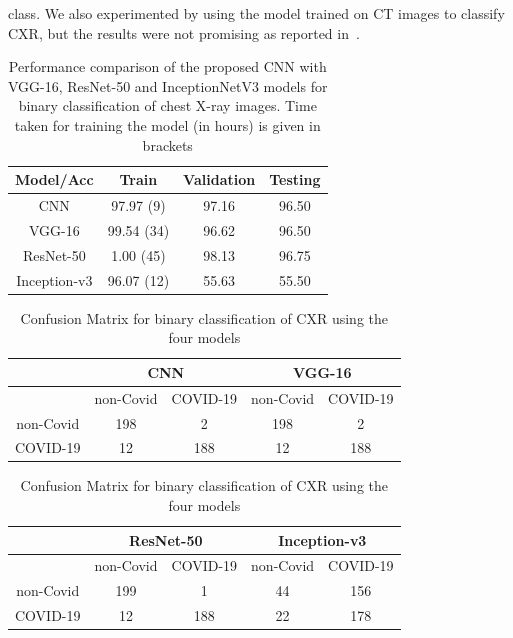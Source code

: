 \documentclass[10pt,journal,compsoc]{IEEEtran}
\begin{document}
class. We also experimented by using the model trained on CT images to classify CXR, but the results were not promising as reported in~\cite{panwar2020deep}.

\begin{table}
\renewcommand{\arraystretch}{1.3}
\caption{Performance comparison of the proposed CNN with VGG-16, ResNet-50 and InceptionNetV3 models for binary classification of chest X-ray images. Time taken for training the model (in hours) is given in brackets}
\label{table_6}
\centering
\begin{tabular}{|c|c|c|c|}
\hline
\bfseries Model/Acc &  \bfseries Train & \bfseries Validation & \bfseries Testing \\
\hline
    CNN   & 97.97 (9)  & 97.16      & 96.50   \\
\hline
    VGG-16     & 99.54 (34)  & 96.62     & 96.50     \\
\hline
    ResNet-50    & 1.00 (45) & 98.13     & 96.75      \\
\hline
 Inception-v3    & 96.07 (12)  & 55.63     & 55.50       \\
\hline
\end{tabular}
\end{table}

\begin{table}
\renewcommand{\arraystretch}{1.3}
\caption{Confusion Matrix for binary classification of CXR using the four models}
\label{table_7}
\centering
\begin{tabular}{|c|c|c|c|c|}
\hline
& \multicolumn{2}{|c|}{\bfseries CNN}  &  \multicolumn{2}{|c|}{\bfseries VGG-16} \\
\hline
 & non-Covid & COVID-19 & non-Covid & COVID-19  \\
\hline
 non-Covid &   198   & 2   & 198      & 2    \\
\hline
   COVID-19 & 12     & 188   & 12     & 188     \\
\hline
   \end{tabular}
   \begin{tabular}{|c|c|c|c|c|}
\hline
& \multicolumn{2}{|c|}{\bfseries ResNet-50}  &  \multicolumn{2}{|c|}{\bfseries Inception-v3} \\
\hline
 & non-Covid & COVID-19 & non-Covid & COVID-19  \\
\hline
 non-Covid &   199   & 1  & 44      & 156    \\
\hline
   COVID-19 & 12     & 188   & 22     & 178     \\
\hline
   \end{tabular}

\end{table}
\end{document}

